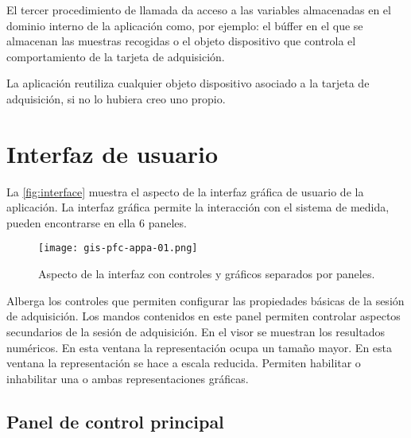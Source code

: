 El tercer procedimiento de llamada da acceso a las variables almacenadas en
el dominio interno de la aplicación como, por ejemplo: el búffer en el que se
almacenan las muestras recogidas o el objeto dispositivo que controla el
comportamiento de la tarjeta de adquisición.

La aplicación reutiliza cualquier objeto dispositivo asociado a la tarjeta
de adquisición, si no lo hubiera creo uno propio.


\section{Interfaz de usuario}

La \vref{fig:interface} muestra el aspecto de la interfaz gráfica de
usuario de la aplicación. La interfaz gráfica permite la interacción con el
sistema de medida, pueden encontrarse en ella 6 paneles.

\begin{figure}
	\begin{center}
		\texttt{[image: gis-pfc-appa-01.png]}
	\end{center}
	\caption[Aspecto de la interfaz de usuario]{Aspecto de la interfaz
	con controles y gráficos separados por paneles.}
	\label{fig:interface}
\end{figure}

\begin{enumerate}
     Alberga los controles que
	permiten configurar las propiedades básicas de la sesión de
	adquisición.
     Los mandos contenidos en
	este panel permiten controlar aspectos secundarios de la sesión de
	adquisición.
     En el visor se muestran los resultados
	numéricos.
     En esta ventana la
	representación ocupa un tamaño mayor.
     En esta ventana la
	representación se hace a escala reducida.
     Permiten habilitar o inhabilitar una o
	ambas representaciones gráficas.
\end{enumerate}


\subsection{Panel de control principal}

